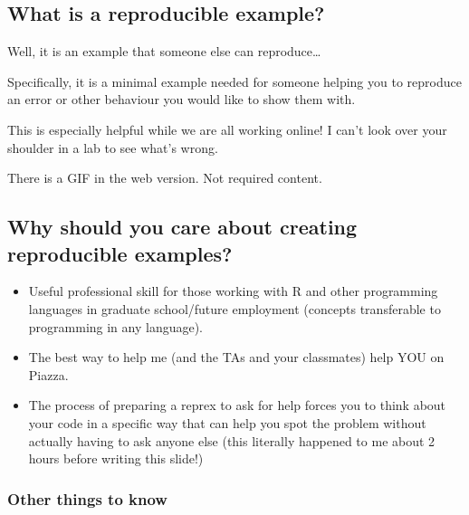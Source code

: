 \documentclass[
  openany]{book}
\providecommand{\tightlist}{%
  \setlength{\itemsep}{0pt}\setlength{\parskip}{0pt}}
\begin{document}
\hypertarget{what-is-a-reproducible-example}{%
\subsection{What is a reproducible example?}\label{what-is-a-reproducible-example}}

Well, it is an example that someone else can reproduce\ldots{}

Specifically, it is a minimal example needed for someone helping you to reproduce an error or other behaviour you would like to show them with.

This is especially helpful while we are all working online! I can't look over your shoulder in a lab to see what's wrong.

There is a GIF in the web version. Not required content.

\hypertarget{why-should-you-care-about-creating-reproducible-examples}{%
\subsection{Why should you care about creating reproducible examples?}\label{why-should-you-care-about-creating-reproducible-examples}}

\begin{itemize}
\tightlist
\item
  Useful professional skill for those working with R and other programming languages in graduate school/future employment (concepts transferable to programming in any language).
\item
  The best way to help me (and the TAs and your classmates) help YOU on Piazza.
\item
  The process of preparing a reprex to ask for help forces you to think about your code in a specific way that can help you spot the problem without actually having to ask anyone else (this literally happened to me about 2 hours before writing this slide!)
\end{itemize}

\hypertarget{other-things-to-know}{%
\subsubsection{Other things to know}\label{other-things-to-know}}
\end{document}
